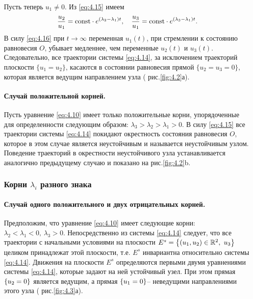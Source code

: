Пусть теперь $u_1 \neq 0$. Из \eqref{eq:4.15} имеем
\begin{equation}
        \label{eq:4.16}
        \frac{u_{2}}{u_1} = \textrm{const} \cdot e^{(\lambda_2-\lambda_1) t}, \quad \frac{u_3}{u_1}=\textrm{const} \cdot e^{(\lambda_3 - \lambda_1) t}.
\end{equation}
В силу \eqref{eq:4.16} при $t \to \infty$ переменная $u_1 (t)$, при стремлении к состоянию равновесия $O$, убывает медленнее, чем переменные $u_2(t)$ и $u_3(t)$.
Следовательно, все траектории системы \eqref{eq:4.14}, за исключением траекторий плоскости $\{ u_1=u_2\}$, касаются в состоянии равновесия прямой $\{ u_2 = u_3 = 0 \}$, которая является ведущим направлением узла ( рис.\ref{fig:4.2}а).
\paragraph{Случай положительной корней.}%
\label{par:sluchai_polozhitel_noi_kornei_}

Пусть уравнение \eqref{eq:4.10} имеет только положительные корни, упорядоченные для определенности следующим образом: $\lambda_3 > \lambda_2>\lambda_1>0$. В силу \eqref{eq:4.15} все траектории системы \eqref{eq:4.14} покидают окрестность состояния равновесия $O$, которое в этом случае является неустойчивым и называется неустойчивым узлом. Поведение траекторий в окрестности неустойчивого узла устанавливается аналогично предыдущему случаю и показано на рис.\ref{fig:4.2}b.

\subsubsection{Корни $\lambda_i$ разного знака}%
\label{ssub:korni_lambda_i_raznogo_znaka}
\paragraph{Случай одного положительного и двух отрицательных корней.}%
\label{par:sluchai_odnogo_polozhitel_nogo_i_dvukh_otritsatel_nykh_kornei_}

Предположим, что уравнение \eqref{eq:4.10} имеет следующие корни: $\lambda_2<\lambda_1<0, ~ \lambda_3>0$. Непосредственно из системы \eqref{eq:4.14} следует, что все траектории с начальными условиями на плоскости $E^{s} = \qty{ (u_1,u_2) \in \mathbb{R}^2, ~ u_3 }$ целиком принадлежат этой плоскости, т.е. $E^s$ инвариантна относительно системы \eqref{eq:4.14}. Движения на плоскости $E^s$ определяются первыми двумя уравнениями системы \eqref{eq:4.14}, которые задают на ней устойчивый узел. При этом прямая 
$\qty{u_2=0}$ является ведущим, а прямая $\qty{u_1 = 0}$-- неведущими направлениями этого узла ( рис.\ref{fig:4.3}а). 

